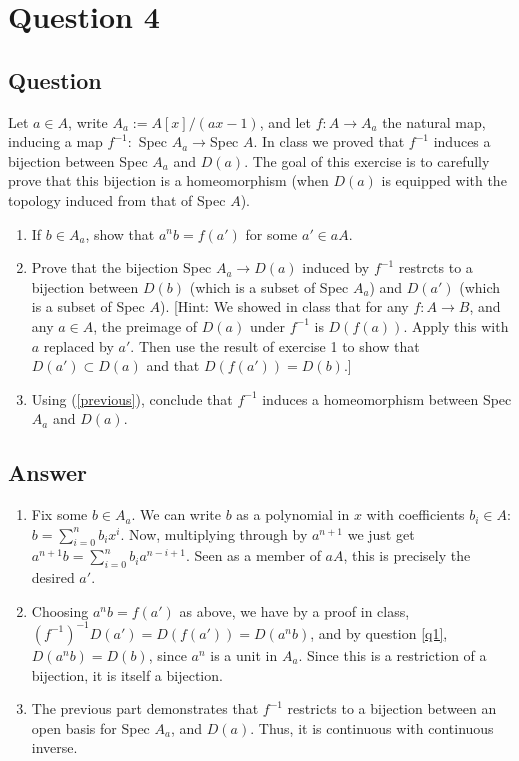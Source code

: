 \documentclass[11pt]{article}
\begin{document}
\section{Question 4}
\subsection{Question}
Let $a \in A $, write $A_a := A[x]/(ax -1 )$, and let $f: A \to A_a$ the natural map, inducing a map $f^{-1} : $ Spec $A_a \to $Spec $A$. In class we proved that $f^{-1}$ induces a bijection between Spec $A_a$ and $D(a)$. The goal of this exercise is to carefully prove that this bijection is a homeomorphism (when $D(a)$ is equipped with the topology induced from that of Spec $A$).
\begin{enumerate}
\item If $b \in A_a$, show that $a^n b= f(a')$ for some $a' \in a A$.
\item \label{previous} Prove that the bijection Spec $A_a \to D(a)$ induced by $f^{-1}$ restrcts to a bijection between $D(b)$ (which is a subset of Spec $A_a$) and $D(a')$ (which is a subset of Spec $A$). [Hint: We showed in class that for any $f: A \to B$, and any $a \in A$, the preimage of $D(a)$ under $f^{-1}$ is $D(f(a))$. Apply this with $a$ replaced by $a'$. Then use the result of exercise 1 to show that $D(a') \subset D(a)$ and that $D(f(a'))=D(b).$]
\item Using (\ref{previous}), conclude that $f^{-1}$ induces a homeomorphism between Spec $A_a$ and $D(a)$.
\end{enumerate}
\subsection{Answer}
\begin{enumerate}
\item Fix some $b \in A_a$. We can write $b$ as a polynomial in $x$ with coefficients  $b_i \in A$: $b = \sum_{i=0}^n b_i x^i$. Now, multiplying through by $a^{n+1}$ we just get $a^{n+1} b = \sum_{i=0}^n b_i a^{n-i+1}$. Seen as a member of $aA$, this is precisely the desired $a'$.
\item Choosing $a^n b = f(a')$ as above, we have by a proof in class, $(f^{-1})^{-1}D(a') = D(f(a')) = D ( a^n b)$, and by question \ref{q1}, $D(a^nb) = D(b)$, since $a^n$ is a unit in $A_a$. Since this is a restriction of a bijection, it is itself a bijection.
\item The previous part demonstrates that $f^{-1}$ restricts to a bijection between an open basis for Spec $A_a$, and $D(a)$. Thus, it is continuous with continuous inverse.
\end{enumerate}
\end{document}
